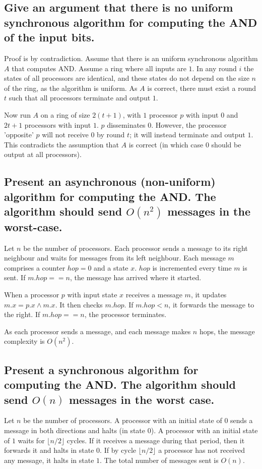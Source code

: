 \documentclass[11pt]{article} %
\begin{document}
\subsection{Give an argument that there is no uniform synchronous algorithm for computing the AND of the input bits.}

Proof is by contradiction. Assume that there is an uniform synchronous algorithm $A$ that computes AND. Assume a ring where all inputs are $1$. In any round $i$ the states of all processors are identical, and these states do not depend on the size $n$ of the ring, as the algorithm is uniform. As $A$ is correct, there must exist a round $t$ such that all processors terminate and output $1$.

Now run $A$ on a ring of size $2(t + 1)$, with $1$ processor $p$ with input $0$ and $2t + 1$ processors with input $1$. $p$ disseminates $0$. However, the processor 'opposite' $p$ will not receive $0$ by round $t$; it will instead terminate and output $1$. This contradicts the assumption that $A$ is correct (in which case $0$ should be output at all processors).  

\subsection{Present an asynchronous (non-uniform) algorithm for computing the AND. The algorithm should send $O(n^2)$ messages in the worst-case.}

Let $n$ be the number of processors. Each processor sends a message to its right neighbour and waits for messages from its left neighbour. Each message $m$ comprises a counter $hop = 0$ and a state $x$. $hop$ is incremented every time $m$ is sent. If $m.hop == n$, the message has arrived where it started. 

When a processor $p$ with input state $x$ receives a message $m$, it updates $m.x = p.x \land m.x$. It then checks $m.hop$. If $m.hop < n$, it forwards the message to the right. If $m.hop == n$, the processor terminates. 

As each processor sends a message, and each message makes $n$ hops, the message complexity is $O(n^2)$.

\subsection{Present a synchronous algorithm for computing the AND. The algorithm should send $O(n)$ messages in the worst case.}

Let $n$ be the number of processors. A processor with an initial state of $0$ sends a message in both directions and halts (in state $0$). A processor with an initial state of $1$ waits for $\lfloor n / 2 \rfloor$ cycles. If it receives a message during that period, then it forwards it and halts in state $0$. If by cycle $\lfloor n / 2 \rfloor$ a processor has not received any message, it halts in state $1$. The total number of messages sent is $O(n)$.
\end{document}
